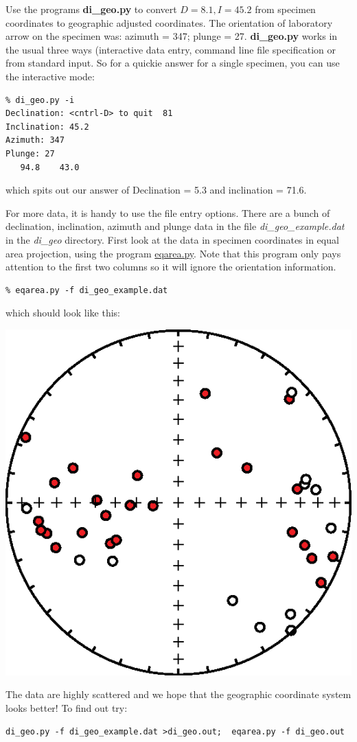 \documentclass[11pt]{book}
\begin{document}
{{{{{Use the programs {\bf di\_geo.py}  to convert
$D=8.1, I=45.2$ from specimen coordinates  to geographic  adjusted coordinates. The
orientation of laboratory arrow on the specimen was: azimuth = 347;
plunge = 27.  
{\bf di\_geo.py} works in the usual three ways (interactive data entry, command line file specification or from standard input.  So for a quickie answer for a single specimen, you can use the interactive mode:

\begin{verbatim}
% di_geo.py -i
Declination: <cntrl-D> to quit  81
Inclination: 45.2
Azimuth: 347
Plunge: 27
   94.8    43.0
\end{verbatim}
\noindent which spits out our answer of Declination = 5.3 and inclination = 71.6.  

For more data, it is handy to use the file entry options. There are a bunch of declination, inclination, azimuth and plunge data in the file {\it di\_geo\_example.dat} in the {\it di\_geo} directory.  First look at the data in specimen coordinates in equal area projection, using the program \href{#eqarea.py}{eqarea.py}.  Note that this program only pays attention to the first two columns so it will ignore the orientation information. 

\begin{verbatim}
% eqarea.py -f di_geo_example.dat
\end{verbatim}
which should look like this:  

  \includegraphics[width=10 cm]{EPSfiles/di_geo_spc_eq.eps}



The data are highly scattered and we hope that the geographic coordinate system looks better!  To find out try:
\begin{verbatim}
di_geo.py -f di_geo_example.dat >di_geo.out;  eqarea.py -f di_geo.out


\end{verbatim}}}}}}
\end{document}
